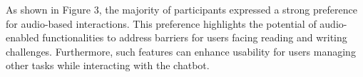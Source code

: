 As shown in Figure 3, the majority of participants
expressed a strong preference for audio-based interactions.
This preference highlights the potential of audio-enabled functionalities to address barriers for users facing reading and
writing challenges. Furthermore, such features can enhance
usability for users managing other tasks while interacting with
the chatbot.












